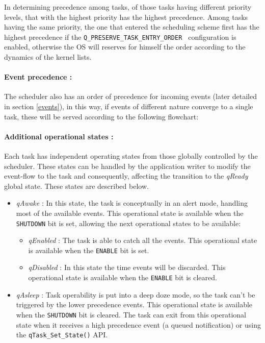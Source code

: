 In determining precedence among tasks, of those tasks having different priority levels, that with the highest priority has the highest precedence. Among tasks having the same priority, the one that entered the scheduling scheme first has the highest precedence if the \lstinline{Q_PRESERVE_TASK_ENTRY_ORDER } configuration is enabled, otherwise the OS will reserves for himself the order according to the dynamics of the kernel lists.

\paragraph{Event precedence :}
The scheduler also has an order of precedence for incoming events (later detailed in section \ref{events}), in this way, if events of different nature converge to a single task, these will be served according to the following flowchart:



\paragraph{Additional operational states :}
Each task has independent operating states from those globally controlled by the scheduler. These states can be handled by the application writer to modify the event-flow to the task and consequently, affecting the transition to the \textit{qReady} global state. These states are described below.

\begin{itemize}
    \item \textit{qAwake} : In this state, the task is conceptually in an alert mode, handling most of the available events. This operational state is available when the \lstinline{SHUTDOWN} bit is set, allowing the next operational states to be available:
    \begin{itemize}
        \item \textit{qEnabled} : The task is able to catch all the events. This operational state is available when the \lstinline{ENABLE} bit is set.
        \item \textit{qDisabled} : In this state the time events will be discarded. This operational state is available when the \lstinline{ENABLE} bit is cleared.
    \end{itemize}
    \item \textit{qAsleep} : Task operability is put into a deep doze mode, so the task can't be triggered by the lower precedence events.  This operational state is available when the \lstinline{SHUTDOWN} bit is cleared. The task can exit from this operational state when it receives a high precedence event (a queued notification) or using the \lstinline{qTask_Set_State()} API.
\end{itemize}

